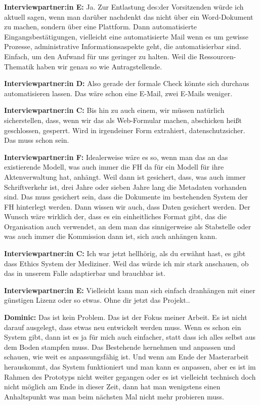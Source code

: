 \documentclass[a4paper,12pt,twoside]{scrreprt}
\begin{document}
\textbf{Interviewpartner:in E:} Ja. Zur Entlastung des:der Vorsitzenden würde ich aktuell sagen, wenn man darüber nachdenkt das nicht über ein Word-Dokument zu machen, sondern über eine Plattform. Dann automatisierte Eingangsbestätigungen, vielleicht eine automatisierte Mail wenn es um gewisse Prozesse, administrative Informationsaspekte geht, die automatisierbar sind. Einfach, um den Aufwand für uns geringer zu halten. Weil die Ressourcen-Thematik haben wir genau so wie Antragstellende.

\textbf{Interviewpartner:in D:} Also gerade der formale Check könnte sich durchaus automatisieren lassen. Das wäre schon eine E-Mail, zwei E-Mails weniger.

\textbf{Interviewpartner:in C:} Bis hin zu auch einem, wir müssen natürlich sicherstellen, dass, wenn wir das als Web-Formular machen, abschicken heißt geschlossen, gesperrt. Wird in irgendeiner Form extrahiert, datenschutzsicher. Das muss schon sein.

\textbf{Interviewpartner:in F:} Idealerweise wäre es so, wenn man das an das existierende Modell, was auch immer die FH da für ein Modell für ihre Aktenverwaltung hat, anhängt. Weil dann ist gesichert, dass, was auch immer Schriftverkehr ist, drei Jahre oder sieben Jahre lang die Metadaten vorhanden sind. Das muss gesichert sein, dass die Dokumente im bestehenden System der FH hinterlegt werden. Dann wissen wir auch, dass Daten gesichert werden. Der Wunsch wäre wirklich der, dass es ein einheitliches Format gibt, das die Organisation auch verwendet, an dem man das sinnigerweise als Stabstelle oder was auch immer die Kommission dann ist, sich auch anhängen kann.

\textbf{Interviewpartner:in C:} Ich war jetzt hellhörig, als du erwähnt hast, es gibt dass Ethics System der Mediziner. Weil das würde ich mir stark anschauen, ob das in unserem Falle adaptierbar und brauchbar ist.

\textbf{Interviewpartner:in E:} Vielleicht kann man sich einfach dranhängen mit einer günstigen Lizenz oder so etwas. Ohne dir jetzt das Projekt..

\textbf{Dominic:} Das ist kein Problem. Das ist der Fokus meiner Arbeit. Es ist nicht darauf ausgelegt, dass etwas neu entwickelt werden muss. Wenn es schon ein System gibt, dann ist es ja für mich auch einfacher, statt dass ich alles selbst aus dem Boden stampfen muss. Das Bestehende hernehmen und anpassen und schauen, wie weit es anpassungsfähig ist. Und wenn am Ende der Masterarbeit herauskommt, das System funktioniert und man kann es anpassen, aber es ist im Rahmen des Prototyps nicht weiter gegangen oder es ist vielleicht technisch doch nicht möglich am Ende in dieser Zeit, dann hat man wenigstens einen Anhaltspunkt was man beim nächsten Mal nicht mehr probieren muss.
\end{document}
